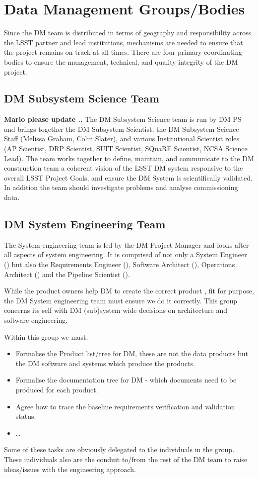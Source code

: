 \section{Data Management Groups/Bodies} \label{sect:groups}
Since the DM team is distributed in terms of geography and responsibility across the LSST partner and lead institutions, mechanisms are needed to ensure that the project remains on track at all times.  There are four primary coordinating bodies to ensure the management, technical, and quality integrity of the DM project.

\subsection{DM Subsystem Science Team \label{sect:dmsst}}
{\bf Mario  please update ..}
The DM Subsystem Science team is run by DM PS and brings together the DM Subsystem Scientist, the DM Subsystem Science Staff (Melissa Graham, Colin Slater), and various Institutional Scientist roles (AP Scientist, DRP Scientist, SUIT Scientist, SQuaRE Scientist, NCSA Science Lead).
The team works together to define, maintain, and communicate to the DM construction team a coherent vision of the LSST DM system responsive to the overall LSST Project Goals, and ensure the DM System is scientifically validated. In addition the team should  investigate problems and analyse commissioning data.

\subsection{DM System Engineering Team \label{sect:sysengt}}
The System engineering team is led by the DM Project Manager and looks
after all aspects of system engineering. It is comprised of not only a System Engineer () but also the Requirements Engineer (), Software Architect (), Operations Architect () and the Pipeline Scientist ().

While the product owners help DM to create the correct product , fit for purpose, the DM System engineering team must ensure we do it correctly. This group concerns its self with DM (sub)system wide decisions on architecture and software engineering.

Within this  group we must:
\begin{itemize}
\item Formalise the Product list/tree for DM, these are not the data products but the DM software and systems which produce the products.
\item Formalise the documentation tree for DM - which documents need to be produced for each product.
\item Agree how to trace the baseline requirements verification and validation status.
\item  \ldots
\end{itemize}
 Some of these tasks are obviously delegated to the individuals in the group. These individuals also are the conduit to/from the rest of the DM team to raise ideas/issues with the engineering approach.

